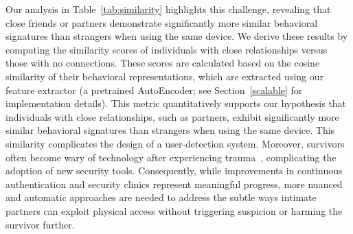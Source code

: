 Our analysis in Table~\ref{tab:similarity} highlights this challenge, revealing that close friends or partners demonstrate significantly more similar behavioral signatures than strangers when using the same device. We derive these results by computing the similarity scores of individuals with close relationships versus those with no connections. These scores are calculated based on the cosine similarity of their behavioral representations, which are extracted using our feature extractor (a pretrained AutoEncoder; see Section~\ref{scalable} for implementation details). This metric quantitatively supports our hypothesis that individuals with close relationships, such as partners, exhibit significantly more similar behavioral signatures than strangers when using the same device. This similarity complicates the design of a user-detection system. Moreover, survivors often become wary of technology after experiencing trauma~\cite{freed2017digital}, complicating the adoption of new security tools. Consequently, while improvements in continuous authentication and security clinics represent meaningful progress, more nuanced and automatic approaches are needed to address the subtle ways intimate partners can exploit physical access without triggering suspicion or harming the survivor further.






